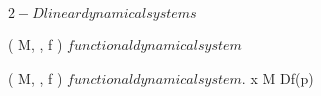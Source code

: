 \documentclass[../Main/main]{subfiles}
\begin{document}
\unit{ $ 2-D linear dynamical systems $ }
{
	
	{
		{
			( M, \N, f ) $ functional dynamical system $
		}
		{
			{
			}
		}
	}


	{
		{
			( M, \N, f ) $ functional dynamical system $.
			x \in M
		}
		{
			Df(p)
		}
	}

}
\end{document}
